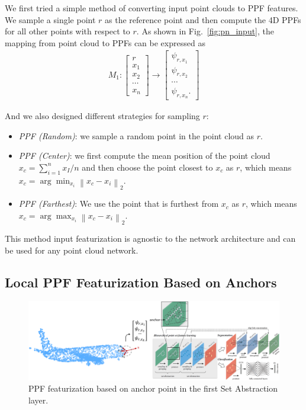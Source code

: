 \documentclass{article}
\newcommand{\norm}[1]{\left\lVert#1\right\rVert}
\begin{document}
We first tried a simple method of converting input point clouds to PPF features. We sample a single point $r$ as the reference point and then compute the 4D PPFs for all other points with respect to $r$. As shown in Fig.~\ref{fig:pn_input}, the mapping from point cloud to PPFs can be expressed as 
\begin{align}
    M_1 : 
    \begin{bmatrix}
    r \\ x_1 \\ x_2 \\ \cdots \\ x_n
    \end{bmatrix}
    \rightarrow
    \begin{bmatrix}
    \psi_{r,x_1} \\ \psi_{r,x_2} \\ \cdots \\ \psi_{r,x_n}.
    \end{bmatrix}
\end{align}

And we also designed different strategies for sampling $r$:
\begin{itemize}
    \item \textit{PPF (Random)}: we sample a random point in the point cloud as $r$. 
    \item \textit{PPF (Center)}: we first compute the mean position of the point cloud $x_c=\sum_{i=1}^n x_I / n$ and then choose the point closest to $x_c$ as $r$, which means $x_c = \arg\min_{x_i} \norm{x_c-x_i}_2$. 
    \item \textit{PPF (Farthest)}: We use the point that is furthest from $x_c$ as $r$, which means $x_c = \arg\max_{x_i} \norm{x_c-x_i}_2$. 
\end{itemize}

This method input featurization is agnostic to the network architecture and can be used for any point cloud network. 

\subsection{Local PPF Featurization Based on Anchors}
\label{section:PPF_anchor}

\begin{figure}[hbt!]
\centering
    \includegraphics[width=.9\linewidth]{images/pn2_input.png}
    \caption{PPF featurization based on anchor point in the first Set Abstraction layer.}
\label{fig:pn2_input}
\end{figure}
\end{document}
